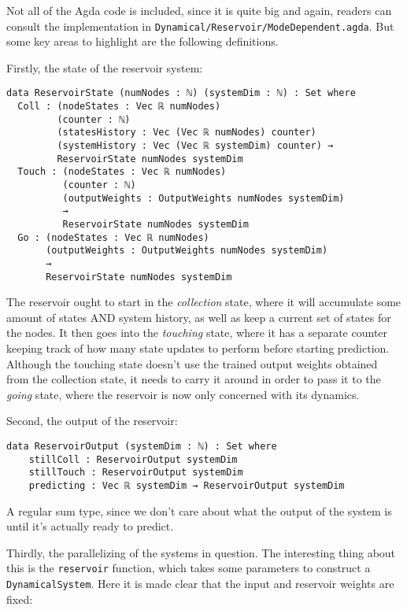 
Not all of the Agda code is included, since it is quite big and again, readers can consult the implementation in \texttt{Dynamical/Reservoir/ModeDependent.agda}. But some key areas to highlight are the following definitions.

Firstly, the state of the reservoir system:

\begin{verbatim}
data ReservoirState (numNodes : ℕ) (systemDim : ℕ) : Set where
  Coll : (nodeStates : Vec ℝ numNodes)
         (counter : ℕ)
         (statesHistory : Vec (Vec ℝ numNodes) counter) 
         (systemHistory : Vec (Vec ℝ systemDim) counter) → 
         ReservoirState numNodes systemDim
  Touch : (nodeStates : Vec ℝ numNodes)
          (counter : ℕ)
          (outputWeights : OutputWeights numNodes systemDim) 
          →
          ReservoirState numNodes systemDim
  Go : (nodeStates : Vec ℝ numNodes)
       (outputWeights : OutputWeights numNodes systemDim)
       →
       ReservoirState numNodes systemDim

\end{verbatim}
The reservoir ought to start in the \textit{collection} state, where it will accumulate some amount of states AND system history, as well as keep a current set of states for the nodes. It then goes into the \textit{touching} state, where it has a separate counter keeping track of how many state updates to perform before starting prediction. Although the touching state doesn't use the trained output weights obtained from the collection state, it needs to carry it around in order to pass it to the \textit{going} state, where the reservoir is now only concerned with its dynamics.

Second, the output of the reservoir:
\begin{verbatim}
data ReservoirOutput (systemDim : ℕ) : Set where
    stillColl : ReservoirOutput systemDim
    stillTouch : ReservoirOutput systemDim
    predicting : Vec ℝ systemDim → ReservoirOutput systemDim
\end{verbatim}

A regular sum type, since we don't care about what the output of the system is until it's actually ready to predict.

Thirdly, the parallelizing of the systems in question. The interesting thing about this is the \texttt{reservoir} function, which takes some parameters to construct a \texttt{DynamicalSystem}. Here it is made clear that the input and reservoir weights are fixed:

